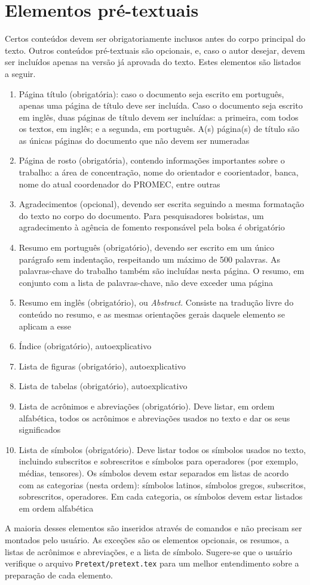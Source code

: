 \section{Elementos pré-textuais}
Certos conteúdos devem ser obrigatoriamente inclusos antes do corpo principal do texto. Outros conteúdos pré-textuais são opcionais, e, caso o autor desejar, devem ser incluídos apenas na versão já aprovada do texto. Estes elementos são listados a seguir.
\begin{enumerate}
    \item Página título (obrigatória): caso o documento seja escrito em português, apenas uma página de título deve ser incluída. Caso o documento seja escrito em inglês, duas páginas de título devem ser incluídas: a primeira, com todos os textos, em inglês; e a segunda, em português. A(s) página(s) de título são as únicas páginas do documento que não devem ser numeradas
    \item Página de rosto (obrigatória), contendo informações importantes sobre o trabalho: a área de concentração, nome do orientador e coorientador, banca, nome do atual coordenador do PROMEC, entre outras
    \item Agradecimentos (opcional), devendo ser escrita seguindo a mesma formatação do texto no corpo do documento. Para pesquisadores bolsistas, um agradecimento à agência de fomento responsável pela bolsa é obrigatório
    \item Resumo em português (obrigatório), devendo ser escrito em um único parágrafo sem indentação, respeitando um máximo de \num{500} palavras. As palavras-chave do trabalho também são incluídas nesta página. O resumo, em conjunto com a lista de palavras-chave, não deve exceder uma página
    \item Resumo em inglês (obrigatório), ou \textit{Abstract}. Consiste na tradução livre do conteúdo no resumo, e as mesmas orientações gerais daquele elemento se aplicam a esse
    \item Índice (obrigatório), autoexplicativo
    \item Lista de figuras (obrigatório), autoexplicativo
    \item Lista de tabelas (obrigatório), autoexplicativo
    \item Lista de acrônimos e abreviações (obrigatório). Deve listar, em ordem alfabética, todos os acrônimos e abreviações usados no texto e dar os seus significados
    \item Lista de símbolos (obrigatório). Deve listar todos os símbolos usados no texto, incluindo subscritos e sobrescritos e símbolos para operadores (por exemplo, médias, tensores). Os símbolos devem estar separados em listas de acordo com as categorias (nesta ordem): símbolos latinos, símbolos gregos, subscritos, sobrescritos, operadores. Em cada categoria, os símbolos devem estar listados em ordem alfabética
\end{enumerate}
A maioria desses elementos são inseridos através de comandos e não precisam ser montados pelo usuário. As exceções são os elementos opcionais, os resumos, a listas de acrônimos e abreviações, e a lista de símbolo. Sugere-se que o usuário verifique o arquivo \texttt{Pretext/pretext.tex} para um melhor entendimento sobre a preparação de cada elemento.

